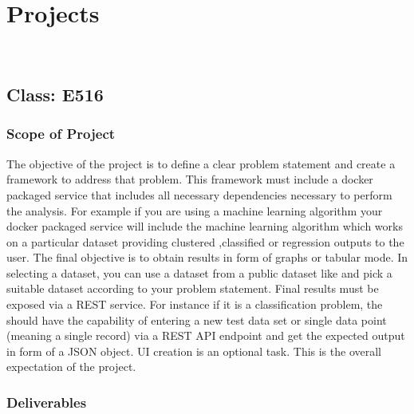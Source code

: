 \chapter{Projects}
\label{c:projects}
\FILENAME\

\section{Class: E516}\label{s:e516-project}

\subsection{Scope of Project}

The objective of the project is to define a clear problem statement
and create a framework to address that problem. This framework must
include a docker packaged service that includes all necessary
dependencies necessary to perform the analysis. For example if you are
using a machine learning algorithm your docker packaged service will
include the machine learning algorithm which works on a particular
dataset providing clustered ,classified or regression outputs to the
user. The final objective is to obtain results in form of graphs or
tabular mode. In selecting a dataset, you can use a dataset from a
public dataset like 
and pick a suitable dataset according to your problem statement. Final
results must be exposed via a REST service. For instance if it is a
classification problem, the should have the capability of entering a
new test data set or single data point (meaning a single record) via a
REST API endpoint and get the expected output in form of a JSON
object. UI creation is an optional task. This is the overall
expectation of the project.

\subsection{Deliverables}

